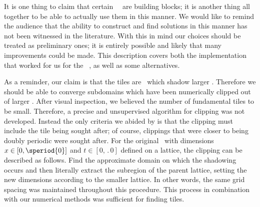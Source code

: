 It is one thing to claim that certain \spt\ \twots\ are building blocks; it is
another thing all together to be able to actually use them in this manner. We would like to
remind the audience that the ability to construct and find solutions in this manner
has not been witnessed in the literature. With this in mind our choices should
be treated as preliminary ones; it is entirely possible and likely that
many improvements could be made. This
description covers both the implementation that worked for us for the \spt\ \KSe,
as well as some alternatives.



As a reminder, our claim is that the tiles are \twots\ which shadow larger \twots.
Therefore we should be able to converge subdomains which have been numerically clipped out
of larger \twots. After visual inspection, we believed the number of fundamental tiles to
be small. Therefore, a precise and unsupervised algorithm for clipping was not developed.
Instead the only criteria we abided by is that the clipping must include the tile being
sought after; of course, clippings that were closer to being doubly periodic were sought after.
For the original \twot\ with dimensions $x \in [0, \speriod{0}]$ and $t \in [0, \period{0}]$ defined on a lattice, the
clipping can be described as follows. Find the approximate domain on which
the shadowing occurs and then literally extract the subregion of the parent lattice,
setting the new {\spt} dimensions according to the smaller lattice. In other words,
the same grid spacing was maintained throughout this procedure.
This process in combination with our numerical methods was sufficient
for finding tiles.

